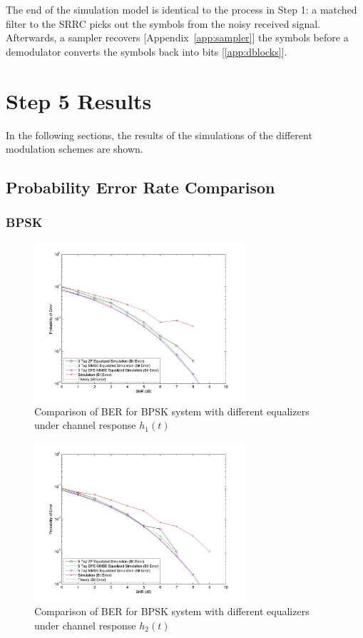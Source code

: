 \documentclass[]{article}
\begin{document}
The end of the simulation model is identical to the process in Step 1: a matched filter to the SRRC picks out the symbols from the noisy received signal.  Afterwards, a sampler recovers [Appendix~\ref{app:sampler}] the symbols before a demodulator converts the symbols back into bits [\ref{app:dblocks}].  



\section{Step 5 Results}
\label{sec:results}
In the following sections, the results of the simulations of the different modulation schemes are shown. 

\subsection{Probability Error Rate Comparison}
\label{sec:compare}

\subsubsection{BPSK}

\begin{figure}[H]
\centering
\includegraphics[width=0.7\textwidth]{bpSNR1.jpg}
\caption{Comparison of BER for BPSK system with different equalizers under channel response $h_1(t)$}
\end{figure}

\begin{figure}[H]
\centering
\includegraphics[width=0.7\textwidth]{bpSNR2.jpg}
\caption{Comparison of BER for BPSK system with different equalizers under channel response $h_2(t)$}
\end{figure}
\end{document}
